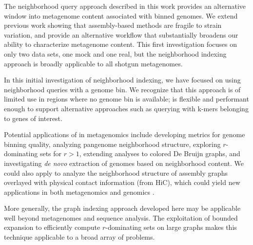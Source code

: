 The neighborhood query approach described in this work provides an
alternative window into metagenome content associated with binned genomes. We extend previous work
showing that assembly-based methods are fragile to strain
variation, and provide an alternative workflow that substantially
broadens our ability to characterize metagenome content.  This first
investigation focuses on only two data sets, one mock and one real, but
the neighborhood indexing approach is broadly applicable to
all shotgun metagenomes.

In this initial investigation of neighborhood indexing, we have
focused on using neighborhood queries with a genome bin.  We recognize
that this approach is of limited use in regions where no genome bin is
available; \sgc is flexible and performant enough to support
alternative approaches such as querying with k-mers belonging to genes
of interest.

Potential applications of \sgc in metagenomics include developing
metrics for genome binning quality, analyzing pangenome neighborhood
structure, exploring $r$-dominating sets for $r > 1$, extending analyses
to colored De Bruijn graphs, and investigating {\em de novo}
extraction of genomes based on neighborhood content.  We could also
apply \sgc to analyze the neighborhood structure of assembly graphs
overlayed with physical contact information (from \eg HiC), which could
yield new applications in both metagenomics and genomics
\cite{Marbouty2014,Beitel2014}.

More generally, the graph indexing approach developed here may be
applicable well beyond metagenomes and sequence analysis.  The
exploitation of bounded expansion to efficiently compute $r$-dominating
sets on large graphs makes this technique applicable to a broad array
of problems.
